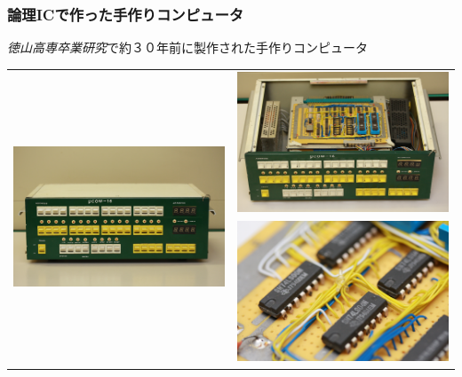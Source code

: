 \documentclass{beamer}                 %
\begin{document}
\begin{frame}
  \frametitle{論理ICで作った手作りコンピュータ}
  \emph{徳山高専卒業研究}で約３０年前に製作された手作りコンピュータ
  \vfill
  \begin{tabular}{c c}
  \multirow{2}{*}{\includegraphics[scale=0.04]{../chap2/uCom16_1.jpg}}
  &\includegraphics[scale=0.03]{../chap2/uCom16_2.jpg} \\
  &\includegraphics[scale=0.03]{../chap2/uCom16_3.jpg}
  \end{tabular}
\end{frame}
\end{document}
